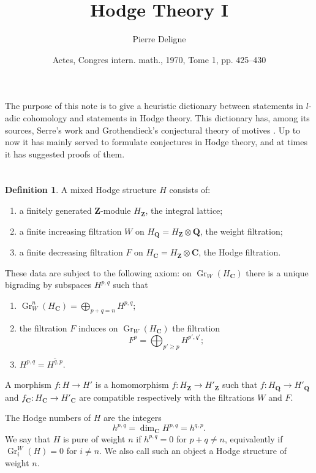 \documentclass[11pt]{amsart}
\theoremstyle{plain}
\theoremstyle{definition}
\newtheorem{definition}[theorem]{Definition}
\theoremstyle{remark}
\DeclareMathOperator{\Gr}{Gr}
\newcommand{\Q}{\mathbf{Q}}
\newcommand{\Z}{\mathbf{Z}}
\newcommand{\C}{\mathbf{C}}
\begin{document}
\title{Hodge Theory I}
\author{Pierre Deligne}
\date{Actes, Congres intern. math., 1970, Tome 1, pp. 425--430}
\maketitle

The purpose of this note is to give a heuristic dictionary between statements in $l$-adic cohomology and statements in Hodge theory. This dictionary has, among its sources, Serre's work \cite{Serre} and Grothendieck's conjectural theory of motives \cite{Demazure}. Up to now it has mainly served to formulate conjectures in Hodge theory, and at times it has suggested proofs of them.

\section{}
\begin{definition}\label{def:p9-1.1}
A mixed Hodge structure $H$ consists of:
\begin{enumerate}
\item[(a)] a finitely generated $\Z$-module $H_\Z$, the integral lattice;
\item[(b)] a finite increasing filtration $W$ on $H_\Q=H_\Z\otimes\Q$, the weight filtration;
\item[(c)] a finite decreasing filtration $F$ on $H_\C=H_\Z\otimes\C$, the Hodge filtration.
\end{enumerate}
These data are subject to the following axiom: on $\Gr_W(H_\C)$ there is a unique bigrading by subspaces $H^{p,q}$ such that
\begin{enumerate}
\item[(i)] $\displaystyle \Gr_W^n(H_\C)=\bigoplus_{p+q=n}H^{p,q}$;
\item[(ii)] the filtration $F$ induces on $\Gr_W(H_\C)$ the filtration
\[
F^p=\bigoplus_{p'\ge p}H^{p',q'};
\]
\item[(iii)] $H^{p,q}=\overline{H^{q,p}}$.
\end{enumerate}
\end{definition}

A morphism $f:H\to H'$ is a homomorphism $f:H_\Z\to H'_\Z$ such that $f:H_\Q\to H'_\Q$ and $f_\C:H_\C\to H'_\C$ are compatible respectively with the filtrations $W$ and $F$.

The Hodge numbers of $H$ are the integers
\begin{equation}\label{eq:p9-1.2}
h^{p,q}=\dim_\C H^{p,q}=h^{q,p}.
\end{equation}
We say that $H$ is pure of weight $n$ if $h^{p,q}=0$ for $p+q\neq n$, equivalently if $\Gr_i^W(H)=0$ for $i\neq n$. We also call such an object a Hodge structure of weight $n$.
\end{document}
